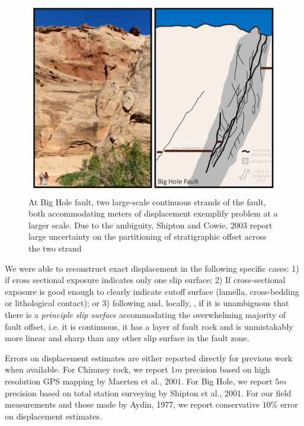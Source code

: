 \documentclass[12pt,a4paper]{article}
\begin{document}
\begin{figure}[h]
	\centering

		\includegraphics[width=\textwidth]{big_hole_cliff}

	\caption{At Big Hole fault, two large-scale continuous strands of the fault, both accommodating meters of displacement exemplify problem at a larger scale. Due to the ambiguity, Shipton and Cowie, 2003 report large uncertainty on the partitioning of stratigraphic offset across the two strand}
	\label{big_hole_cliff}
\end{figure}  

We were able to reconstruct exact displacement in the following specific cases: 1) if cross sectional exposure indicates only one slip surface; 2) If cross-sectional exposure is good enough to clearly indicate cutoff surface (lamella, cross-bedding or lithological contact); or 3) following \cite{chester1986implications} and, locally, \cite{shipton2001damage}, if it is unambiguous that there is a \textit{principle slip surface} accommodating the overwhelming majority of fault offset, i.e. it is continuous, it has a layer of fault rock and is unmistakably more linear and sharp than any other slip surface in the fault zone. 

Errors on displacement estimates are either reported directly for previous work when available. For Chimney rock, we report $1m$ precision based on high resolution GPS mapping by Maerten et al., 2001. For Big Hole, we report $5m$ precision based on total station surveying by Shipton et al., 2001. For our field measurements and those made by Aydin, 1977, we report conservative $10\%$ error on displacement estimates. 
\end{document}
